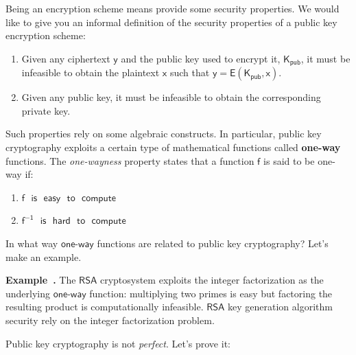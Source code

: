 \documentclass{article}
\newcounter{example}[section]
\newenvironment{example}[1][]{\refstepcounter{example}\par\medskip
   \noindent \textbf{Example~\theexample. #1} \rmfamily}{\medskip}
\newcounter{definition}[section]
\newcounter{fact}[section]
\begin{document}
\par \noindent Being an encryption scheme means provide some security properties. We would like to give you an informal definition of the security properties of a public key encryption scheme:

\begin{enumerate}
    \item Given any ciphertext $\mathsf{y}$ and the public key used to encrypt it, $\mathsf{K_{\text{pub}}}$, it must be infeasible to obtain the plaintext $\mathsf{x}$ such that $\mathsf{y = E(K_{\text{pub}}, x)}$.
    \item Given any public key, it must be infeasible to obtain the corresponding private key.
\end{enumerate}
 
\par \noindent Such properties rely on some algebraic constructs. In particular, public key cryptography exploits a certain type of mathematical functions called \textbf{one-way} functions. The \textit{one-wayness} property states that a function $\mathsf{f}$ is said to be one-way if:

\begin{enumerate}
    \item $\mathsf{f \text{ } is \text{ } easy \text{ } to \text{ } compute}$
    \item $\mathsf{f^{-1} \text{ } is \text{ } hard \text{ } to \text{ } compute}$
\end{enumerate}

\par \noindent In what way $\mathsf{one\text{-}way}$ functions are related to public key cryptography? Let's make an example.

\begin{example}
    The $\mathsf{RSA}$ cryptosystem exploits the integer factorization as the underlying $\mathsf{one\text{-}way}$ function: multiplying two primes is easy but factoring the resulting product is computationally infeasible. $\mathsf{RSA}$ key generation algorithm security rely on the integer factorization problem.
\end{example}

\par \noindent Public key cryptography is not \textit{perfect}. Let's prove it:
\end{document}
